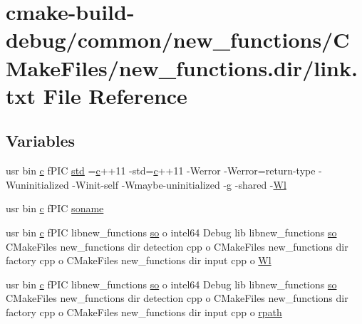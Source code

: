 \hypertarget{common_2new__functions_2CMakeFiles_2new__functions_8dir_2link_8txt}{}\section{cmake-\/build-\/debug/common/new\+\_\+functions/\+C\+Make\+Files/new\+\_\+functions.dir/link.txt File Reference}
\label{common_2new__functions_2CMakeFiles_2new__functions_8dir_2link_8txt}
\subsection*{Variables}
\begin{DoxyCompactItemize}
\item 
usr bin \hyperlink{CMakeCache_8txt_aac1d6a1710812201527c735f7c6afbaa}{c} f\+P\+IC \hyperlink{common_2new__functions_2CMakeFiles_2new__functions_8dir_2link_8txt_a5f87c8f8e33670f7c8c5221b6be1bcc4}{std} =\hyperlink{CMakeCache_8txt_aac1d6a1710812201527c735f7c6afbaa}{c}++11 -\/std=\hyperlink{CMakeCache_8txt_aac1d6a1710812201527c735f7c6afbaa}{c}++11 -\/Werror -\/Werror=return-\/type -\/Wuninitialized -\/Winit-\/self -\/Wmaybe-\/uninitialized -\/g -\/shared -\/\hyperlink{thirdparty_2extension_2CMakeFiles_2cpu__extension_8dir_2link_8txt_af9ccbf658ed2deb89d0d79f211e5b033}{Wl}
\item 
usr bin \hyperlink{CMakeCache_8txt_aac1d6a1710812201527c735f7c6afbaa}{c} f\+P\+IC \hyperlink{common_2new__functions_2CMakeFiles_2new__functions_8dir_2link_8txt_ab65a9b6457c4853ed17f89f945516e66}{soname}
\item 
usr bin \hyperlink{CMakeCache_8txt_aac1d6a1710812201527c735f7c6afbaa}{c} f\+P\+IC libnew\+\_\+functions \hyperlink{CMakeCache_8txt_aa98797039f48d335ee715de4cd92852f}{so} o intel64 Debug lib libnew\+\_\+functions \hyperlink{CMakeCache_8txt_aa98797039f48d335ee715de4cd92852f}{so} C\+Make\+Files new\+\_\+functions dir detection cpp o C\+Make\+Files new\+\_\+functions dir factory cpp o C\+Make\+Files new\+\_\+functions dir input cpp o \hyperlink{common_2new__functions_2CMakeFiles_2new__functions_8dir_2link_8txt_a0596de7a6efcd0247ff6e5eeab4ed988}{Wl}
\item 
usr bin \hyperlink{CMakeCache_8txt_aac1d6a1710812201527c735f7c6afbaa}{c} f\+P\+IC libnew\+\_\+functions \hyperlink{CMakeCache_8txt_aa98797039f48d335ee715de4cd92852f}{so} o intel64 Debug lib libnew\+\_\+functions \hyperlink{CMakeCache_8txt_aa98797039f48d335ee715de4cd92852f}{so} C\+Make\+Files new\+\_\+functions dir detection cpp o C\+Make\+Files new\+\_\+functions dir factory cpp o C\+Make\+Files new\+\_\+functions dir input cpp o \hyperlink{common_2new__functions_2CMakeFiles_2new__functions_8dir_2link_8txt_a6950ac3dca872843988baa1c1c5a94e4}{rpath}
\end{DoxyCompactItemize}


